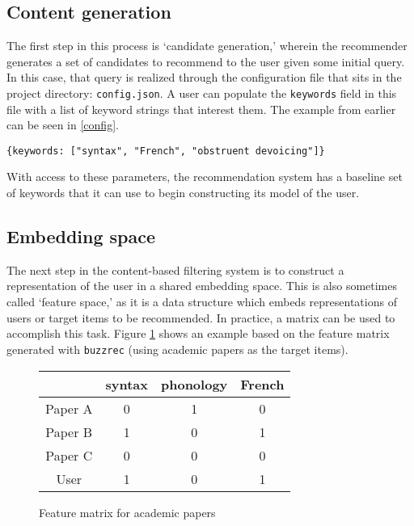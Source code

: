 \documentclass{article}
\begin{document}
\subsection{Content generation}
 The first step in this process is `candidate generation,' wherein the recommender generates a set of candidates to recommend to the user given some initial query. In this case, that query is realized through the configuration file that sits in the project directory: \texttt{config.json}. A user can populate the \texttt{keywords} field in this file with a list of keyword strings that interest them. The example from earlier can be seen in \ref{config}.

\begin{exe}
\ex
\label{config}
\texttt{\{keywords: ["syntax", "French", "obstruent devoicing"]\}}
\end{exe}

With access to these parameters, the recommendation system has a baseline set of keywords that it can use to begin constructing its model of the user.

\subsection{Embedding space}
The next step in the content-based filtering system is to construct a representation of the user in a shared embedding space. This is also sometimes called `feature space,' as it is a data structure which embeds representations of users or target items to be recommended. In practice, a matrix can be used to accomplish this task. Figure \ref{matrix} shows an example based on the feature matrix generated with \texttt{buzzrec} (using academic papers as the target items).  \\

\begin{figure}[!ht]
\begin{center}
 \begin{tabular}{cccc}
    \toprule
           & syntax & phonology & French \\ \midrule
    Paper A & 0   & 1  & 0  \\
    Paper B & 1   & 0   & 1  \\
    Paper C & 0   & 0   & 0  \\
    User & 1  & 0  & 1 \\ \bottomrule
  \end{tabular}
\end{center}
\caption{Feature matrix for academic papers}
\label{matrix}
\end{figure}
\end{document}
